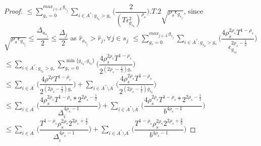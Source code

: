 \begin{proof}
\hspace*{0em}$\leq\sum_{g_{*}=0}^{max_{j\in A^{'}}g_{s_{j}}}\sum_{i\in A^{''}:g_{s_{k}}>g_{*}}\bigg(\dfrac{2}{(T\epsilon_{g_{s_{k}}}^{2})^{\rho_{s}}} \bigg).T.2\sqrt{\rho_{s}\epsilon_{g_{s_{j}}}}$, since $\sqrt{\rho_{s}\epsilon_{g_{s_{j}}}}\leq\dfrac{\Delta_{a_{s_{j}}}}{2}\leq  \dfrac{\Delta_{j}}{2}$ as $\hat{r}_{a_{s_{j}}}>\hat{r}_{j},\forall j\in s_{j}$
\newline
\hspace*{0em}$\leq\sum_{g_{*}=0}^{max_{j\in A^{'}}g_{s_{j}}}\sum_{i\in A^{''}:g_{s_{k}}>g_{*}}\bigg(\dfrac{4\rho_{s}^{2\rho_{s}} T^{1-\rho_{s}}}{\epsilon_{g_{s_{k}}}^{2\rho_{s} - \frac{1}{2}}} \bigg) $
\newline
\hspace*{0em}$\leq\sum_{i\in A^{''}:g_{s_{k}}>g_{*}}\sum_{g_{*}=0}^{\min{\lbrace g_{s_{k}},g_{s_{b}}\rbrace}}\bigg(\dfrac{4\rho_{s}^{2\rho_{s}}T^{1-\rho_{s}}}{2^{({2\rho_{s} - \frac{1}{2}})g_{*}}} \bigg) $
\newline
\hspace*{0em}$\leq\sum_{i\in A^{'}}\bigg(\dfrac{4\rho^{2\rho}T^{1-\rho_{s}}}{2^{({2\rho_{s} - \frac{1}{2}})g_{*}}} \bigg)+\sum_{i\in A^{''}\setminus A^{'}}\bigg(\dfrac{4\rho_{s}^{2\rho_{s}}T^{1-\rho_{s}}}{2^{({2\rho_{s} - \frac{1}{2}})g_{s_{b}}}} \bigg)$
\newline
\hspace*{0em}$\leq\sum_{i\in A^{'}}\bigg(\dfrac{4\rho_{s}^{2\rho_{s}}T^{1-\rho_{s}}*2^{2\rho_{s}-\frac{1}{2}}}{\Delta_{i}^{4\rho_{s}-1}} \bigg)+\sum_{i\in A^{''}\setminus A^{'}}\bigg(\dfrac{4\rho_{s}^{2\rho_{s}}T^{1-\rho_{s}}*2^{2\rho_{s}-\frac{1}{2}}}{b^{4\rho_{s}-1}} \bigg)$
\newline
\hspace*{0em}$\leq\sum_{i\in A^{'}}\bigg(\dfrac{T^{1-\rho_{s}}\rho_{s}^{2\rho_{s}}2^{2\rho_{s}+\frac{3}{2}}}{\Delta_{i}^{4\rho_{s}-1}} \bigg)+\sum_{i\in A^{''}\setminus A^{'}}\bigg(\dfrac{T^{1-\rho_{s}}\rho_{s}^{2\rho_{s}}2^{2\rho_{s}+\frac{3}{2}}}{b^{4\rho_{s}-1}} \bigg)$


\end{proof}
